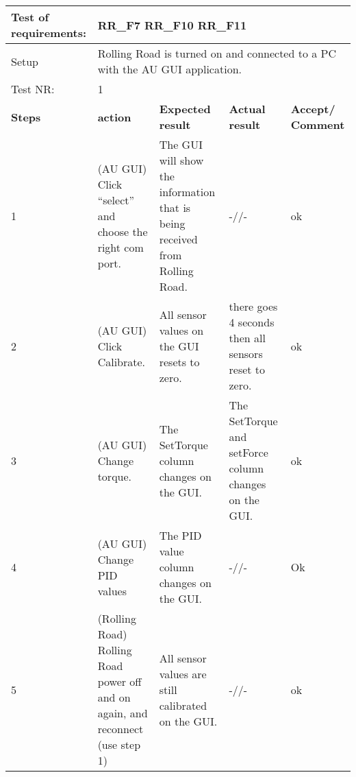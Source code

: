 \begin{table}[h!]
	\centering
	\label{my-label}	
	\begin{tabular}{|p{1.5 cm}|p{4.2 cm}|p{2.1 cm}|p{2.1 cm}|p{2.1 cm}|}
		\hline
		Test of requirements: 
		& \multicolumn{4}{l|}{RR\_F7 RR\_F10 RR\_F11} \\ \hline
		Setup 
		& \multicolumn{4}{l|}{Rolling Road is turned on and connected to a PC with the AU GUI application.} \\ \hline
		Test NR:
		& \multicolumn{4}{l|}{1} \\ \hline
		\textbf{Steps} & \textbf{action} & \textbf{Expected result} & 
		\textbf{Actual result} & \textbf{Accept/ Comment} \\ \hline
		1 
		& (AU GUI) Click “select” and choose the right com port. 
		& The GUI will show the information that is being received from Rolling Road.
		& -//-
		& ok \\  \hline
		2
		& (AU GUI) Click Calibrate.
		& All sensor values on the GUI resets to zero.
		& there goes 4 seconds then all sensors reset to zero.
		& ok\\ \hline
		3
		& (AU GUI) Change torque.
		& The SetTorque column changes on the GUI.
		& The SetTorque and setForce column changes on the GUI.
		& ok\\ \hline
		4
		& (AU GUI) Change PID values
		& The PID value column changes on the GUI.
		& -//-
		& Ok\\ \hline
		5
		& (Rolling Road) Rolling Road power off and on again, and reconnect (use step 1)
		& All sensor values are still calibrated on the GUI.
		& -//-
		& ok\\ \hline
	\end{tabular}
	\caption{}
\end{table}


